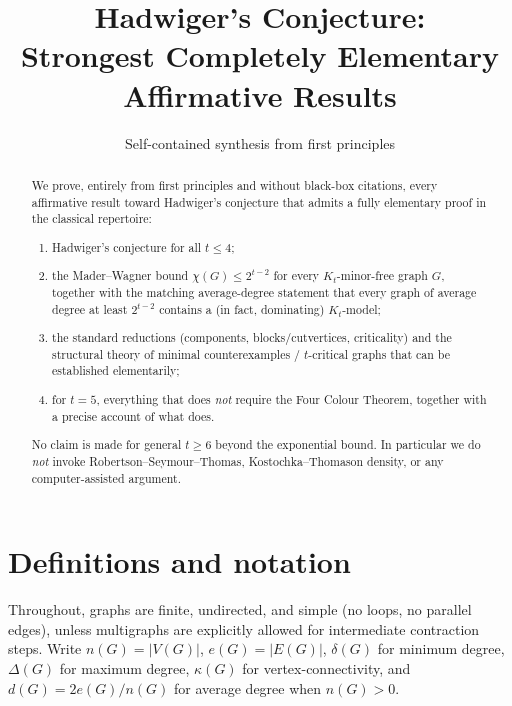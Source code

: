 \documentclass[11pt]{article}
\title{Hadwiger's Conjecture:\\
Strongest Completely Elementary Affirmative Results}
\author{Self-contained synthesis from first principles}
\date{}
\theoremstyle{definition}
\begin{document}
\maketitle

\begin{abstract}
We prove, entirely from first principles and without black-box citations,
every affirmative result toward Hadwiger's conjecture that admits a fully
elementary proof in the classical repertoire:
\begin{enumerate}
\item Hadwiger's conjecture for all \(t\le 4\);
\item the Mader--Wagner bound \(\chi(G)\le 2^{t-2}\) for every \(K_t\)-minor-free
graph \(G\), together with the matching average-degree statement that every
graph of average degree at least \(2^{t-2}\) contains a (in fact, dominating)
\(K_t\)-model;
\item the standard reductions (components, blocks/cutvertices, criticality)
and the structural theory of minimal counterexamples / \(t\)-critical graphs
that can be established elementarily;
\item for \(t=5\), everything that does \emph{not} require the Four Colour
Theorem, together with a precise account of what does.
\end{enumerate}
No claim is made for general \(t\ge 6\) beyond the exponential bound. In
particular we do \emph{not} invoke Robertson--Seymour--Thomas, Kostochka--Thomason
density, or any computer-assisted argument.
\end{abstract}

\tableofcontents

\section{Definitions and notation}

Throughout, graphs are finite, undirected, and simple (no loops, no parallel
edges), unless multigraphs are explicitly allowed for intermediate contraction
steps. Write \(n(G)=|V(G)|\), \(e(G)=|E(G)|\), \(\delta(G)\) for minimum degree,
\(\Delta(G)\) for maximum degree, \(\kappa(G)\) for vertex-connectivity, and
\(d(G)=2e(G)/n(G)\) for average degree when \(n(G)>0\).
\end{document}
